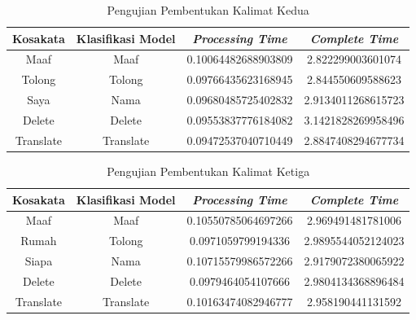 \begin{longtable}{|c|c|c|c|}
  \caption{Pengujian Pembentukan Kalimat Kedua}
  \label{tb:prediksikombinasi2}                                   \\
  \hline
  \rowcolor[HTML]{C0C0C0}
  \textbf{Kosakata} & \textbf{Klasifikasi Model} & \textbf{\emph{Processing Time}} & \textbf{\emph{Complete Time}}\\
  \hline
  Maaf              & Maaf                        & 0.10064482688903809                           & 2.822299003601074                                  \\
  Tolong            & Tolong                        & 0.09766435623168945                           & 2.844550609588623                                  \\
  Saya              & Nama                        & 0.09680485725402832                           & 2.9134011268615723                                  \\
  Delete              & Delete                        & 0.09553837776184082                           & 3.1421828269958496                                  \\
  Translate              & Translate                        & 0.09472537040710449                           & 2.8847408294677734                                  \\
  \hline
\end{longtable}

\begin{longtable}{|c|c|c|c|}
  \caption{Pengujian Pembentukan Kalimat Ketiga}
  \label{tb:prediksikombinasi3}                                   \\
  \hline
  \rowcolor[HTML]{C0C0C0}
  \textbf{Kosakata} & \textbf{Klasifikasi Model} & \textbf{\emph{Processing Time}} & \textbf{\emph{Complete Time}}\\
  \hline
  Maaf              & Maaf                        & 0.10550785064697266                           & 2.969491481781006                                  \\
  Rumah            & Tolong                        & 0.0971059799194336                           & 2.9895544052124023                                  \\
  Siapa              & Nama                        & 0.10715579986572266                           & 2.9179072380065922                                  \\
  Delete              & Delete                        & 0.0979464054107666                           & 2.9804134368896484                                  \\
  Translate              & Translate                        & 0.10163474082946777                           & 2.958190441131592                                  \\
  \hline
\end{longtable}

